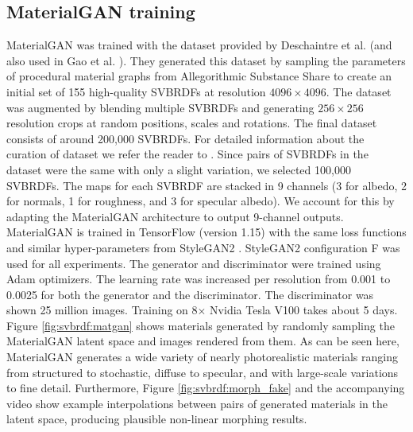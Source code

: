 \subsection{MaterialGAN training}
\label{ssec:training}

MaterialGAN was trained with the dataset provided by Deschaintre et al. \cite{deschaintre2018single} (and also used in Gao et al. \cite{gao2019deep}). They generated this dataset by sampling the parameters of procedural material graphs from Allegorithmic Substance Share to create an initial set of 155 high-quality SVBRDFs at resolution $4096 \times 4096$. The dataset was augmented by blending multiple SVBRDFs and generating $256 \times 256$ resolution crops at random positions, scales and rotations. The final dataset consists of around 200,000 SVBRDFs. For detailed information about the curation of dataset we refer the reader to \cite{deschaintre2018single}. Since pairs of SVBRDFs in the dataset were the same with only a slight variation, we selected 100,000 SVBRDFs.
The maps for each SVBRDF are stacked in 9 channels (3 for albedo, 2 for normals, 1 for roughness, and 3 for specular albedo). We account for this by adapting the MaterialGAN architecture to output 9-channel outputs. MaterialGAN is trained in TensorFlow (version 1.15) with the same loss functions and similar hyper-parameters from StyleGAN2 \cite{karras2020analyzing}. StyleGAN2 configuration F was used for all experiments. The generator and discriminator were trained using Adam optimizers. The learning rate was increased per resolution from 0.001 to 0.0025 for both the generator and the discriminator. The discriminator was shown 25 million images. Training on 8$\times$ Nvidia Tesla V100 takes about 5 days.
Figure \ref{fig:svbrdf:matgan} shows materials generated by randomly sampling the MaterialGAN latent space and images rendered from them. As can be seen here, MaterialGAN generates a wide variety of nearly photorealistic materials ranging from structured to stochastic, diffuse to specular, and with large-scale variations to fine detail. Furthermore, Figure \ref{fig:svbrdf:morph_fake} and the accompanying video show example interpolations between pairs of generated materials in the latent space, producing plausible non-linear morphing results.


